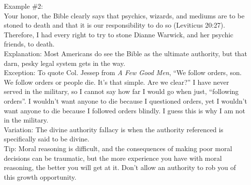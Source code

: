 \documentclass[a4paper,12pt,single,pdftex]{scrartcl}
\begin{document}
    
      Example \#2:
    \\

    
      Your honor, the Bible clearly says that psychics, wizards, and mediums are to be stoned to death and that it is our responsibility to do so (Leviticus 20:27).  Therefore, I had every right to try to stone Dianne Warwick, and her psychic friends, to death.
    \\

    
      Explanation: Most Americans do see the Bible as the ultimate authority, but that darn, pesky legal system gets in the way.
    \\

    
      Exception: To quote Col. Jessep from {\it A Few Good Men}, “We follow orders, son. We follow orders or people die. It's that simple. Are we clear?”  I have never served in the military, so I cannot say how far I would go when just, “following orders”.  I wouldn’t want anyone to die because I questioned orders, yet I wouldn’t want anyone to die because I followed orders blindly.  I guess this is why I am not in the military.
    \\

    
      Variation: The divine authority fallacy is when the authority referenced is specifically said to be divine.
    \\

    
      Tip: Moral reasoning is difficult, and the consequences of making poor moral decisions can be traumatic, but the more experience you have with moral reasoning, the better you will get at it. Don’t allow an authority to rob you of this growth opportunity.
    \\

  
\end{document}
